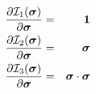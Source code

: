 \begin{eqnarray}
\frac{\partial {\cal I}_1(\bm\sigma)}{\partial \bm\sigma} &=& {\bm 1} \\
\frac{\partial {\cal I}_2(\bm\sigma)}{\partial \bm\sigma} &=& {\bm \sigma} \\
\frac{\partial {\cal I}_3(\bm\sigma)}{\partial \bm\sigma} &=& \bm\sigma \cdot \bm\sigma
\end{eqnarray}








































